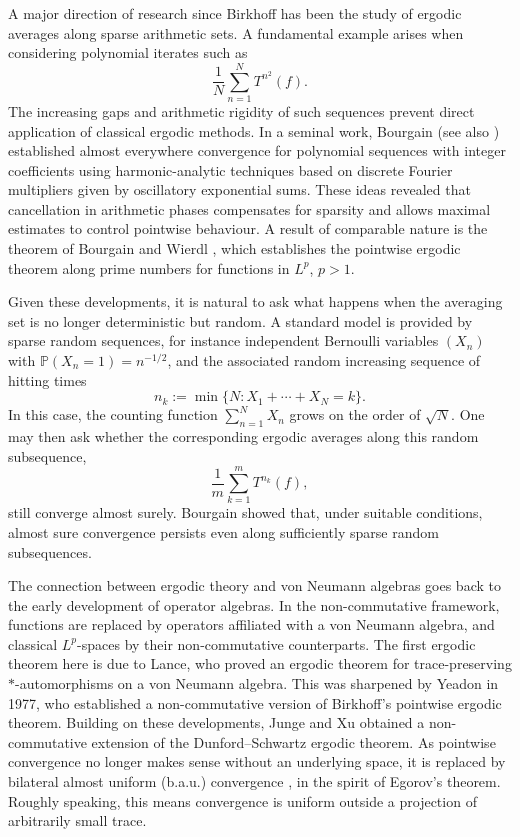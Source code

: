 \documentclass[12pt]{amsart}
\theoremstyle{remark}
\theoremstyle{definition}
\numberwithin{equation}{section}
\begin{document}
\smallskip
A major direction of research since Birkhoff has been the study of ergodic averages along sparse arithmetic sets. A fundamental example arises when considering polynomial iterates such as  \[ \frac{1}{N}\sum_{n=1}^{N} T^{n^2}(f).\] The increasing gaps and arithmetic rigidity of such sequences prevent direct application of classical ergodic methods. In a seminal work, Bourgain \cite{B2} (see also \cite{B,B7,B5}) established almost everywhere convergence for polynomial sequences with integer coefficients using harmonic-analytic techniques based on discrete Fourier multipliers given by oscillatory exponential sums. These ideas revealed that cancellation in arithmetic phases compensates for sparsity and allows maximal estimates to control pointwise behaviour. A result of comparable nature is the theorem of Bourgain \cite{B5} and Wierdl \cite{W}, which establishes the pointwise ergodic theorem along prime numbers for functions in \( L^p \), \( p > 1 \).
\smallskip

Given these developments, it is natural to ask what happens when the averaging set is no longer deterministic but random. A standard model is provided by sparse random sequences, for instance independent Bernoulli variables \((X_n)\) with \(\mathbb{P}(X_n = 1) = n^{-1/2}\), and the associated random increasing sequence of hitting times
\[
n_k := \min\{N : X_1 + \cdots + X_N = k\}.
\]
In this case, the counting function \(\sum_{n=1}^N X_n\) grows on the order of \(\sqrt{N}\). One may then ask whether the corresponding ergodic averages along this random subsequence,
\[
\frac{1}{m} \sum_{k=1}^m T^{n_k}(f),
\]
still converge almost surely. Bourgain \cite[Appendix~1]{B} showed that, under suitable conditions, almost sure convergence persists even along sufficiently sparse random subsequences.
\medskip

The connection between ergodic theory and von Neumann algebras goes back to the early development of operator algebras. In the non-commutative framework, functions are replaced by operators affiliated with a von Neumann algebra, and classical \(L^p\)-spaces by their non-commutative counterparts. The first ergodic theorem here is due to Lance, who proved an ergodic theorem for trace-preserving \(*\)-automorphisms on a von Neumann algebra. This was sharpened by Yeadon in 1977, who established a non-commutative version of Birkhoff’s pointwise ergodic theorem. Building on these developments, Junge and Xu \cite{JX} obtained a non-commutative extension of the Dunford--Schwartz ergodic theorem. As pointwise convergence no longer makes sense without an underlying space, it is replaced by bilateral almost uniform (b.a.u.) convergence \cite{Y}, in the spirit of Egorov's theorem. Roughly speaking, this means convergence is uniform outside a projection of arbitrarily small trace.
\smallskip
\end{document}
